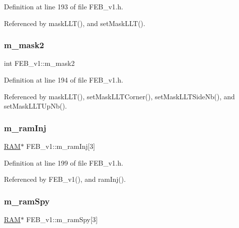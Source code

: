 Definition at line 193 of file F\+E\+B\+\_\+v1.\+h.



Referenced by mask\+L\+L\+T(), and set\+Mask\+L\+L\+T().

\mbox{\label{classFEB__v1_a25f03f6de00618dd575fc1f77a9af9ee}} 
\subsubsection{\texorpdfstring{m\+\_\+mask2}{m\_mask2}}
{\footnotesize\ttfamily int F\+E\+B\+\_\+v1\+::m\+\_\+mask2\hspace{0.3cm}{\ttfamily [private]}}



Definition at line 194 of file F\+E\+B\+\_\+v1.\+h.



Referenced by mask\+L\+L\+T(), set\+Mask\+L\+L\+T\+Corner(), set\+Mask\+L\+L\+T\+Side\+Nb(), and set\+Mask\+L\+L\+T\+Up\+Nb().

\mbox{\label{classFEB__v1_a3a3d06225c94c88d4cc5da7a6bde3867}} 
\subsubsection{\texorpdfstring{m\+\_\+ram\+Inj}{m\_ramInj}}
{\footnotesize\ttfamily \hyperlink{classRAM}{R\+AM}$\ast$ F\+E\+B\+\_\+v1\+::m\+\_\+ram\+Inj\mbox{[}3\mbox{]}\hspace{0.3cm}{\ttfamily [private]}}



Definition at line 199 of file F\+E\+B\+\_\+v1.\+h.



Referenced by F\+E\+B\+\_\+v1(), and ram\+Inj().

\mbox{\label{classFEB__v1_ae6d8176c12bd60ad25ed81d535eb8c82}} 
\subsubsection{\texorpdfstring{m\+\_\+ram\+Spy}{m\_ramSpy}}
{\footnotesize\ttfamily \hyperlink{classRAM}{R\+AM}$\ast$ F\+E\+B\+\_\+v1\+::m\+\_\+ram\+Spy\mbox{[}3\mbox{]}\hspace{0.3cm}{\ttfamily [private]}}




